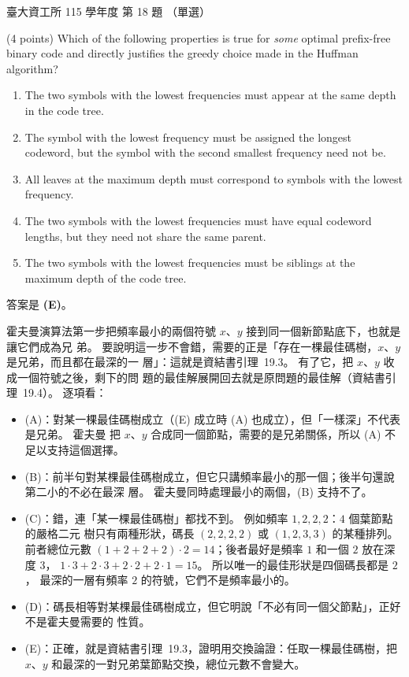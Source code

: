 \begin{pastexam}[label={px:ntu-115-dsa-18}]{臺大資工所 115 學年度 第 18 題}
（單選）

(4 points) Which of the following properties is true for \textit{some} optimal prefix-free binary code and directly justifies the greedy choice made in the Huffman algorithm?
\begin{enumerate}[label=(\Alph*)]
\item The two symbols with the lowest frequencies must appear at the same depth in the code tree.
\item The symbol with the lowest frequency must be assigned the longest codeword, but the symbol with the second smallest frequency need not be.
\item All leaves at the maximum depth must correspond to symbols with the lowest frequency.
\item The two symbols with the lowest frequencies must have equal codeword lengths, but they need not share the same parent.
\item The two symbols with the lowest frequencies must be siblings at the maximum depth of the code tree.
\end{enumerate}
\end{pastexam}

\begin{pastsoln}
答案是 \textbf{(E)}。

霍夫曼演算法第一步把頻率最小的兩個符號 $x$、$y$ 接到同一個新節點底下，也就是讓它們成為兄
弟。 要說明這一步不會錯，需要的正是「存在一棵最佳碼樹，$x$、$y$ 是兄弟，而且都在最深的一
層」：這就是資結書引理~19.3。 有了它，把 $x$、$y$ 收成一個符號之後，剩下的問
題的最佳解展開回去就是原問題的最佳解（資結書引理~19.4）。 逐項看：

\begin{itemize}
\item (A)：對某一棵最佳碼樹成立（(E) 成立時 (A) 也成立），但「一樣深」不代表是兄弟。 霍夫曼
把 $x$、$y$ 合成同一個節點，需要的是兄弟關係，所以 (A) 不足以支持這個選擇。
\item (B)：前半句對某棵最佳碼樹成立，但它只講頻率最小的那一個；後半句還說第二小的不必在最深
層。 霍夫曼同時處理最小的兩個，(B) 支持不了。
\item (C)：錯，連「某一棵最佳碼樹」都找不到。 例如頻率 $1, 2, 2, 2$：$4$ 個葉節點的嚴格二元
樹只有兩種形狀，碼長 $(2, 2, 2, 2)$ 或 $(1, 2, 3, 3)$ 的某種排列。 前者總位元數
$(1 + 2 + 2 + 2) \cdot 2 = 14$；後者最好是頻率 $1$ 和一個 $2$ 放在深度 $3$，
$1 \cdot 3 + 2 \cdot 3 + 2 \cdot 2 + 2 \cdot 1 = 15$。 所以唯一的最佳形狀是四個碼長都是 $2$，
最深的一層有頻率 $2$ 的符號，它們不是頻率最小的。
\item (D)：碼長相等對某棵最佳碼樹成立，但它明說「不必有同一個父節點」，正好不是霍夫曼需要的
性質。
\item (E)：正確，就是資結書引理~19.3，證明用交換論證：任取一棵最佳碼樹，把
$x$、$y$ 和最深的一對兄弟葉節點交換，總位元數不會變大。
\end{itemize}
\end{pastsoln}
